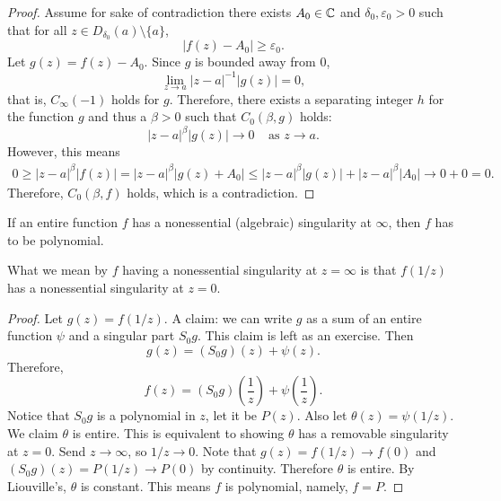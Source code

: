 \begin{proof}
    Assume for sake of contradiction there exists $A_0 \in \operatorname{\mathbb{C}}$
    and $\delta_0, \varepsilon_0 > 0$ such that for all
    $z \in D_{\delta_0}(a) \setminus \{a\}$, 
    \[ |f(z) - A_0 | \ge \varepsilon_0. \]
    Let $g(z) = f(z) - A_0$.
    Since $g$ is bounded away from $0$,
    \[ \lim_{z \to a} |z-a|^{-1} |g(z)| = 0, \]
    that is, $C_{\infty}(-1)$ holds for $g$.
    Therefore, there exists a separating integer $h$ for the
    function $g$ and thus a $\beta > 0$ such that $C_0(\beta, g)$
    holds:
    \[ |z-a|^{\beta}|g(z)| \to 0 \;\;\;\; \text{as $z \to a$.} \]
    However, this means
    \begin{align*}
        0 \ge |z-a|^{\beta} |f(z)| = |z-a|^{\beta}|g(z) + A_0|
        \le |z-a|^{\beta}|g(z)| + |z-a|^{\beta}|A_0| \to
        0 + 0 = 0.
    \end{align*}
    Therefore, $C_0(\beta, f)$ holds, which is a contradiction.
\end{proof}

\begin{theorem}
    If an entire function $f$ has a 
    nonessential (algebraic) singularity at $\infty$,
    then $f$ has to be polynomial.
\end{theorem}
What we mean by $f$ having a nonessential singularity at
$z = \infty$ is that $f(1/z)$
has a nonessential singularity at $z = 0$.

\begin{proof}
    Let $g(z) = f(1/z)$.
    A claim: we can write $g$ as a sum of an entire function
    $\psi$ and a singular part $S_0g$.
    This claim is left as an exercise.
    Then
    \[ g(z) = (S_0g)(z) + \psi(z). \]
    Therefore,
    \[ f(z) = (S_0g)\left(\frac{1}{z}\right) + \psi\left(\frac{1}{z}\right). \]
    Notice that $S_0g$ is a polynomial in $z$, let it be $P(z)$.
    Also let $\theta(z) = \psi(1/z)$.
    We claim $\theta$ is entire.
    This is equivalent to showing $\theta$ has a removable
    singularity at $z=0$.
    Send $z \to \infty$, so $1/z \to 0$.
    Note that $g(z) = f(1/z) \to f(0)$ and 
    $(S_0g)(z) = P(1/z) \to P(0)$ by continuity.
    Therefore $\theta$ is entire.
    By Liouville's, $\theta$ is constant.
    This means $f$ is polynomial, namely, $f = P$.
\end{proof}

